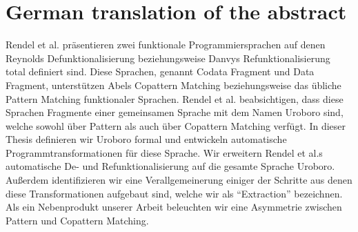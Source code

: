 \chapter{German translation of the abstract}

Rendel et al. präsentieren zwei funktionale Programmiersprachen auf denen Reynolds Defunktionalisierung beziehungsweise Danvys Refunktionalisierung total definiert sind. Diese Sprachen, genannt Codata Fragment und Data Fragment, unterstützen Abels Copattern Matching beziehungsweise das übliche Pattern Matching funktionaler Sprachen. Rendel et al. beabsichtigen, dass diese Sprachen Fragmente einer gemeinsamen Sprache mit dem Namen Uroboro sind, welche sowohl über Pattern als auch über Copattern Matching verfügt. In dieser Thesis definieren wir Uroboro formal und entwickeln automatische Programmtransformationen für diese Sprache. Wir erweitern Rendel et al.s automatische De- und Refunktionalisierung auf die gesamte Sprache Uroboro. Außerdem identifizieren wir eine Verallgemeinerung einiger der Schritte aus denen diese Transformationen aufgebaut sind, welche wir als ``Extraction'' bezeichnen. Als ein Nebenprodukt unserer Arbeit beleuchten wir eine Asymmetrie zwischen Pattern und Copattern Matching.
